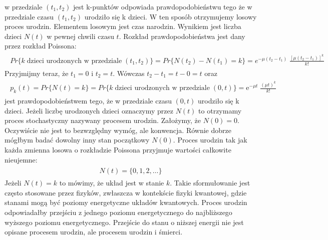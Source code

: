 \documentclass[a4paper,12pt,polish]{sphinxmanual}
\begin{document}
w przedziale $(t_1, t_2)$ jest k-punktów odpowiada prawdopodobieństwu tego że w przedziale
czasu $(t_1, t_2)$ urodziło się k dzieci. W ten sposób otrzymujemy losowy proces urodzin.
Elementem losowym jest czas narodzin. Wynikiem jest liczba dzieci $N(t)$ w pewnej chwili
czasu $t$. Rozkład prawdopodobieństwa jest dany przez rozkład Poissona:
\label{ch3/chIII021:equation-eqn20}\begin{gather}
\begin{split} Pr\{k \; \mbox{dzieci urodzonych w przedziale} \; (t_1, t_2)\} = Pr\{N(t_2) - N(t_1) =k\} = e^{-\mu (t_2 - t_1)} \; \frac{[\mu (t_2 - t_1)]^k}{k!}\end{split}\label{ch3/chIII021-eqn20}
\end{gather}
Przyjmijmy teraz, że $t_1 = 0$ i $t_2 =t$. Wówczas $t_2 - t_1 =t-0=t$ oraz
\label{ch3/chIII021:equation-eqn21}\begin{gather}
\begin{split} p_k(t) = Pr\{N(t) = k\} = Pr\{k \; \mbox{dzieci urodzonych w przedziale} \; (0, t)\} = \mbox{e}^{-\mu t} \; \frac{(\mu t)^k}{k!}\end{split}\label{ch3/chIII021-eqn21}
\end{gather}
jest prawdopodobieństwem tego, że w przedziale czasu $(0, t)$ urodziło się k dzieci. Jeżeli liczbę urodzonych dzieci oznaczymy przez $N(t)$ to otrzymamy proces stochastyczny nazywany procesem urodzin. Założymy, że $N(0) = 0$. Oczywiście nie jest to bezwzględny wymóg, ale konwencja. Równie dobrze mógłbym badać dowolny inny stan początkowy $N(0)$. Proces urodzin tak jak każda zmienna losowa o rozkładzie Poissona przyjmuje wartości całkowite nieujemne:
\label{ch3/chIII021:equation-eqn22}\begin{gather}
\begin{split}N(t) = \{0, 1, 2, \dots\}\end{split}\label{ch3/chIII021-eqn22}
\end{gather}
Jeżeli $N(t) = k$ to mówimy, że układ jest w stanie $k$.
Takie sformułowanie jest często stosowane przez fizyków, zwłaszcza w
kontekście fizyki kwantowej, gdzie stanami mogą być poziomy energetyczne
układów kwantowych. Proces urodzin odpowiadałby przejściu z jednego
poziomu energetycznego do najbliższego wyższego poziomu energetycznego.
Przejście do stanu o niższej energii nie jest opisane procesem urodzin,
ale procesem urodzin i śmierci.
\end{document}
